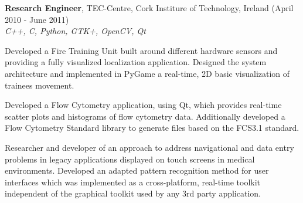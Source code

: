 \documentclass[alan.tex]{subfiles}
\begin{document}
  \item \textbf{Research Engineer}, TEC-Centre, Cork Institure of Technology, Ireland (April 2010 - June 2011)\\
    \emph{C++, C, Python, GTK+, OpenCV, Qt}
    \begin{my_desc}
      \item[Developed] a Fire Training Unit built around different hardware sensors and providing a fully visualized localization application. Designed the system architecture and implemented in PyGame a real-time, 2D basic visualization of trainees movement.
      \item[Developed] a Flow Cytometry application, using Qt, which provides real-time scatter plots and histograms of flow cytometry data. Additionally developed a Flow Cytometry Standard library to generate files based on the FCS3.1 standard.
      \item[Researcher] and developer of an approach to address navigational and data entry problems in
        legacy applications displayed on touch screens in medical environments. Developed an
        adapted pattern recognition method for user interfaces which was implemented as a cross-platform,
        real-time toolkit independent of the graphical toolkit used by any 3rd party application.
  \end{my_desc}
\end{document}
